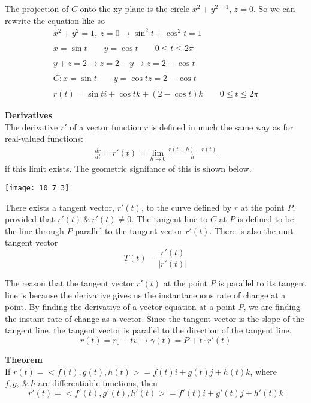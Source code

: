 \documentclass{article}
\begin{document}
  The projection of $ C $ onto the xy plane is the circle $ x^{2}+y^{2=1}$, $ z=0 $. So we can rewrite the equation like so   
  \[
      \begin{gathered}
        x^{2}+y^{2}=1,~z=0 \to \sin^{2}{t}+\cos^{2}{t}=1\\
        ~\\
        x=\sin{t} \qquad y=\cos{t} \qquad 0\le t \le 2\pi\\
        ~\\
        y+z=2 \to z=2-y \to z = 2 - \cos{t}\\
        ~\\
        C: x=\sin{t} \qquad y=\cos{t} z = 2-\cos{t}\\
        ~\\
        r(t)=\sin{t}i+\cos{t}k+(2-\cos{t})k \qquad 0\le t \le 2\pi
      \end{gathered}
  \]

  \textbf{Derivatives}\\
  The derivative $ r' $ of a vector function $ r $ is defined in much the same way as for real-valued functions:
  \[
      \begin{gathered}
      \frac{dr}{dt} =r'(t)=\lim_{h \to 0}{\frac{r(t+h)-r(t)}{h}}
      \end{gathered}
  \]
  if this limit exists. The geometric signifance of this is shown below.
  \begin{center}
      \texttt{[image: 10\_7\_3]}
  \end{center}

  There exists a tangent vector, $ r'(t) $, to the curve defined by $ r $ at the point $ P $, provided that $ r'(t) ~\&~ r'(t) \neq 0$. The tangent line to $ C $ at $ P $ is defined to be the line through $ P $ parallel to the tangent vector $ r'(t) $. There is also the unit tangent vector
  \[
      T(t)=\frac{r'(t)}{| r'(t) |} 
  \]

  The reason that the tangent vector $r'(t)$ at the point $ P $ is parallel to its tangent line is because the derivative gives us the instantaneuous rate of change at a point. By finding the derivative of a vector equation at a point $ P $, we are finding the instant rate of change as a vector. Since the tangent vector is the slope of the tangent line, the tangent vector is parallel to the direction of the tangent line.
  \[
      r(t)=r_{0}+tv\to \gamma(t)=P + t \cdot r'(t)
  \]

  \textbf{Theorem}\\
  If $ r(t) =< f(t), g(t), h(t) > = f(t)i + g(t)j + h(t)k$, where $ f,g,~\&~ h $ are differentiable functions, then
  \[
    r'(t) =< f'(t), g'(t), h'(t) > = f'(t)i + g'(t)j + h'(t)k
  \]
\end{document}

